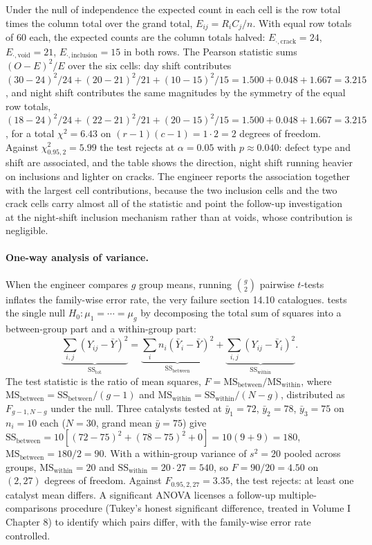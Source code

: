 Under the null of independence the expected count in each cell is the
row total times the column total over the grand total, $E_{ij} =
R_{i}C_{j}/n$. With equal row totals of $60$ each, the expected counts
are the column totals halved: $E_{\cdot,\text{crack}} = 24$,
$E_{\cdot,\text{void}} = 21$, $E_{\cdot,\text{inclusion}} = 15$ in both
rows. The Pearson statistic sums $(O - E)^{2}/E$ over the six cells:
day shift contributes $(30-24)^{2}/24 + (20-21)^{2}/21 +
(10-15)^{2}/15 = 1.500 + 0.048 + 1.667 = 3.215$, and night shift
contributes the same magnitudes by the symmetry of the equal row
totals, $(18-24)^{2}/24 + (22-21)^{2}/21 + (20-15)^{2}/15 = 1.500 +
0.048 + 1.667 = 3.215$, for a total $\chi^{2} = 6.43$ on $(r-1)(c-1) =
1 \cdot 2 = 2$ degrees of freedom. Against $\chi^{2}_{0.95,2} = 5.99$
the test rejects at $\alpha = 0.05$ with $p \approx 0.040$: defect type
and shift are associated, and the table shows the direction, night
shift running heavier on inclusions and lighter on cracks. The engineer
reports the association together with the largest cell contributions,
because the two inclusion cells and the two crack cells carry almost
all of the statistic and point the follow-up investigation at the
night-shift inclusion mechanism rather than at voids, whose
contribution is negligible.

\paragraph{One-way analysis of variance.} When the engineer
compares $g$ group means, running $\binom{g}{2}$ pairwise
$t$-tests inflates the family-wise error rate, the very failure
section 14.10 catalogues.  tests the single
null $H_{0}: \mu_{1} = \cdots = \mu_{g}$ by decomposing the total
sum of squares into a between-group part and a within-group part:
\[
\underbrace{\sum_{i,j}(Y_{ij} - \bar{Y})^{2}}_{\mathrm{SS_{tot}}}
= \underbrace{\sum_{i} n_{i}(\bar{Y}_{i} - \bar{Y})^{2}}_{\mathrm{SS_{between}}}
+ \underbrace{\sum_{i,j}(Y_{ij} - \bar{Y}_{i})^{2}}_{\mathrm{SS_{within}}}.
\]
The test statistic is the ratio of mean squares, $F = \mathrm{MS_{between}}
/ \mathrm{MS_{within}}$, where $\mathrm{MS_{between}} =
\mathrm{SS_{between}}/(g-1)$ and $\mathrm{MS_{within}} =
\mathrm{SS_{within}}/(N - g)$, distributed as $F_{g-1, N-g}$ under
the null. Three catalysts tested at $\bar{y}_{1} = 72$,
$\bar{y}_{2} = 78$, $\bar{y}_{3} = 75$ on $n_{i} = 10$ each
($N = 30$, grand mean $\bar{y} = 75$) give $\mathrm{SS_{between}} =
10[(72-75)^{2} + (78-75)^{2} + 0] = 10(9 + 9) = 180$,
$\mathrm{MS_{between}} = 180/2 = 90$. With a within-group variance
of $s^{2} = 20$ pooled across groups, $\mathrm{MS_{within}} = 20$
and $\mathrm{SS_{within}} = 20 \cdot 27 = 540$, so $F = 90/20 =
4.50$ on $(2, 27)$ degrees of freedom. Against $F_{0.95, 2, 27}
= 3.35$, the test rejects: at least one catalyst mean differs. A
significant ANOVA licenses a follow-up multiple-comparisons
procedure (Tukey's honest significant difference, treated in
Volume I Chapter 8) to identify which pairs differ, with the
family-wise error rate controlled.

